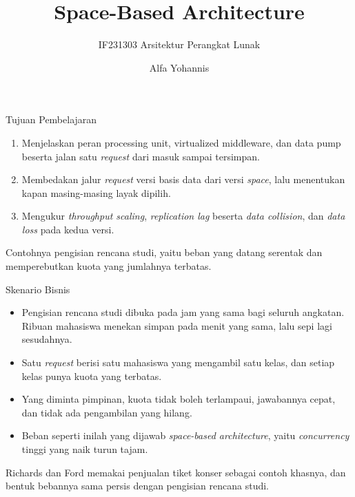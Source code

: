 \documentclass[aspectratio=169, table, 12pt]{beamer}
\title{\Huge{Space-Based Architecture}}
\subtitle{IF231303 Arsitektur Perangkat Lunak}
\author{Alfa Yohannis}
\begin{document}
\frame{\titlepage}


\begin{frame}{{\Large Tujuan Pembelajaran}}
  \vspace{10pt}
  \begin{enumerate}
    \item Menjelaskan peran processing unit, virtualized middleware, dan
          data pump beserta jalan satu \textit{request} dari masuk sampai
          tersimpan.
    \item Membedakan jalur \textit{request} versi basis data dari versi
          \textit{space}, lalu menentukan kapan masing-masing layak dipilih.
    \item Mengukur \textit{throughput scaling}, \textit{replication lag}
          beserta \textit{data collision}, dan \textit{data loss} pada kedua
          versi.
  \end{enumerate}

  \vspace{10pt}
  {\small Contohnya pengisian rencana studi, yaitu beban yang datang serentak
  dan memperebutkan kuota yang jumlahnya terbatas.}
\end{frame}

\begin{frame}{{\Large Skenario Bisnis}}
  \vspace{10pt}
  \begin{itemize}\small
    \item Pengisian rencana studi dibuka pada jam yang sama bagi seluruh
          angkatan. Ribuan mahasiswa menekan simpan pada menit yang sama, lalu
          sepi lagi sesudahnya.
    \item Satu \textit{request} berisi satu mahasiswa yang mengambil satu
          kelas, dan setiap kelas punya kuota yang terbatas.
    \item Yang diminta pimpinan, kuota tidak boleh terlampaui, jawabannya
          cepat, dan tidak ada pengambilan yang hilang.
    \item Beban seperti inilah yang dijawab \textit{space-based architecture},
          yaitu \textit{concurrency} tinggi yang naik turun tajam.
  \end{itemize}

  \vspace{10pt}
  {\small Richards dan Ford memakai penjualan tiket konser sebagai contoh
  khasnya, dan bentuk bebannya sama persis dengan pengisian rencana studi.}
\end{frame}
\end{document}
